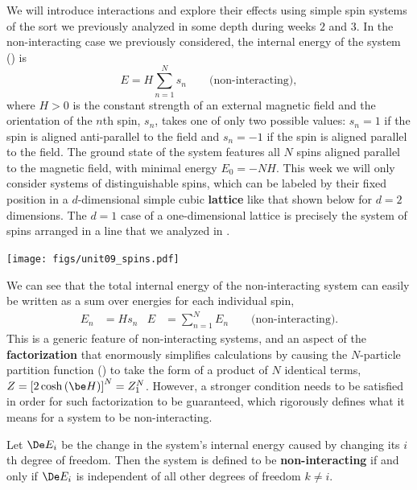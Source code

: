 We will introduce interactions and explore their effects using simple spin systems of the sort we previously analyzed in some depth during weeks $2$ and $3$.
In the non-interacting case we previously considered, the internal energy of the system () is
\begin{equation*}
  E = H \sum_{n = 1}^N s_n \qquad \mbox{(non-interacting)},
\end{equation*}
where $H > 0$ is the constant strength of an external magnetic field and the orientation of the $n$th spin, $s_n$, takes one of only two possible values: $s_n = 1$ if the spin is aligned anti-parallel to the field and $s_n = -1$ if the spin is aligned parallel to the field.
The ground state of the system features all $N$ spins aligned parallel to the magnetic field, with minimal energy $E_0 = -NH$.
This week we will only consider systems of distinguishable spins, which can be labeled by their fixed position in a $d$-dimensional simple cubic \textbf{lattice} like that shown below for $d = 2$ dimensions.
The $d = 1$ case of a one-dimensional lattice is precisely the system of spins arranged in a line that we analyzed in .

\begin{center}\texttt{[image: figs/unit09\_spins.pdf]}\end{center}

We can see that the total internal energy of the non-interacting system can easily be written as a sum over energies for each individual spin,
\begin{align*}
  E_n & = H s_n &
  E & = \sum_{n = 1}^N E_n \qquad \mbox{(non-interacting)}.
\end{align*}
This is a generic feature of non-interacting systems, and an aspect of the \textbf{factorization} that enormously simplifies calculations by causing the $N$-particle partition function () to take the form of a product of $N$ identical terms, $Z = \left[2\cosh\left(\be H\right)\right]^N = Z_1^N$.
However, a stronger condition needs to be satisfied in order for such factorization to be guaranteed, which rigorously defines what it means for a system to be non-interacting.

\begin{shaded}
  Let $\De E_i$ be the change in the system's internal energy caused by changing its $i$th degree of freedom.
  Then the system is defined to be \textbf{non-interacting} if and only if $\De E_i$ is independent of all other degrees of freedom $k \ne i$.
\end{shaded}

